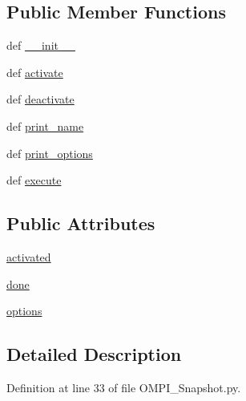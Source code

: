 \subsection*{Public Member Functions}
\begin{DoxyCompactItemize}
\item 
def \hyperlink{classOMPI__Snapshot_1_1OMPI__Snapshot_ab7795ea126dd1e33d4aa35e700fd0c14}{\-\_\-\-\_\-init\-\_\-\-\_\-}
\item 
def \hyperlink{classOMPI__Snapshot_1_1OMPI__Snapshot_a7adf04e52684ba6a4a9f0c2d9001bc4a}{activate}
\item 
def \hyperlink{classOMPI__Snapshot_1_1OMPI__Snapshot_a32a5364e9912d080292da1e56fe7f442}{deactivate}
\item 
def \hyperlink{classOMPI__Snapshot_1_1OMPI__Snapshot_ab7af9c3fc76ac8ac4a6776b40e50c9a6}{print\-\_\-name}
\item 
def \hyperlink{classOMPI__Snapshot_1_1OMPI__Snapshot_a7ce21ba8a546a75996c46e54196d51f4}{print\-\_\-options}
\item 
def \hyperlink{classOMPI__Snapshot_1_1OMPI__Snapshot_ae42ce34decdca8b8eb6a55f1fae6bce6}{execute}
\end{DoxyCompactItemize}
\subsection*{Public Attributes}
\begin{DoxyCompactItemize}
\item 
\hyperlink{classOMPI__Snapshot_1_1OMPI__Snapshot_a0e9ff636eea9c2e0593cc1e4f57c3b24}{activated}
\item 
\hyperlink{classOMPI__Snapshot_1_1OMPI__Snapshot_a6434d87ad221c54daecf11d8ad5604f8}{done}
\item 
\hyperlink{classOMPI__Snapshot_1_1OMPI__Snapshot_a1977ca5a7120bd199d1de101a0fb8c34}{options}
\end{DoxyCompactItemize}


\subsection{Detailed Description}


Definition at line 33 of file O\-M\-P\-I\-\_\-\-Snapshot.\-py.



